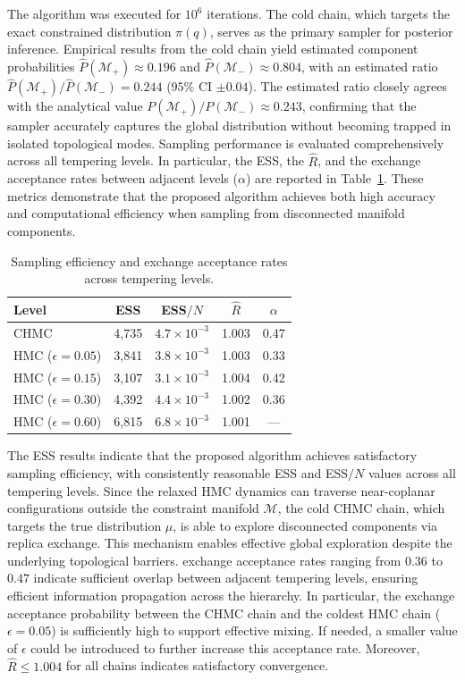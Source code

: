 \documentclass[12pt]{article}
\begin{document}
The algorithm was executed for $10^6$ iterations. The cold chain, which targets the exact constrained distribution $\pi(q)$, serves as the primary sampler for posterior inference. Empirical results from the cold chain yield estimated component probabilities $\widehat{P}(\mathcal{M}_+) \approx 0.196$ and $\widehat{P}(\mathcal{M}_-) \approx 0.804$, with an estimated ratio $\widehat{P}(\mathcal{M}_+) / \widehat{P}(\mathcal{M}_-) = 0.244$ ($95\%$ CI $\pm 0.04$).
The estimated ratio closely agrees with the analytical value $P(\mathcal{M}_+)/P(\mathcal{M}_-) \approx 0.243$, confirming that the sampler accurately captures the global distribution without becoming trapped in isolated topological modes.
Sampling performance is evaluated comprehensively across all tempering levels. In particular, the ESS, the $\hat{R}$, and the exchange acceptance rates between adjacent levels ($\alpha$) are reported in Table~\ref{tab:sampling-efficiency}. These metrics demonstrate that the proposed algorithm achieves both high accuracy and computational efficiency when sampling from disconnected manifold components.

\begin{table}[h]
\centering
\caption{Sampling efficiency and exchange acceptance rates across tempering levels.}
\label{tab:sampling-efficiency}
\begin{tabular}{lcccc}
\toprule
\textbf{Level} & \textbf{ESS} & \textbf{ESS$/N$} & $\hat{R}$ & $\alpha$ \\
\midrule
CHMC & 4{,}735 & $4.7\times10^{-3}$ & 1.003 & 0.47 \\
HMC ($\epsilon = 0.05$) & 3{,}841 & $3.8\times10^{-3}$ & 1.003 & 0.33 \\
HMC ($\epsilon = 0.15$) & 3{,}107 & $3.1\times10^{-3}$ & 1.004 & 0.42 \\
HMC ($\epsilon = 0.30$) & 4{,}392 & $4.4\times10^{-3}$ & 1.002 & 0.36 \\
HMC ($\epsilon = 0.60$) & 6{,}815 & $6.8\times10^{-3}$ & 1.001 & --- \\
\bottomrule
\end{tabular}
\end{table}
The ESS results indicate that the proposed algorithm achieves satisfactory sampling efficiency, with consistently reasonable ESS and ESS$/N$ values across all tempering levels. 
Since the relaxed HMC dynamics can traverse near-coplanar configurations outside the constraint manifold $\mathcal{M}$, the cold CHMC chain, which targets the true distribution $\mu$, is able to explore disconnected components via replica exchange. This mechanism enables effective global exploration despite the underlying topological barriers.
exchange acceptance rates ranging from $0.36$ to $0.47$ indicate sufficient overlap between adjacent tempering levels, ensuring efficient information propagation across the hierarchy. In particular, the exchange acceptance probability between the CHMC chain and the coldest HMC chain ($\epsilon = 0.05$) is sufficiently high to support effective mixing. If needed, a smaller value of $\epsilon$ could be introduced to further increase this acceptance rate.
Moreover, $\hat{R} \leq 1.004$ for all chains indicates satisfactory convergence.
\end{document}
